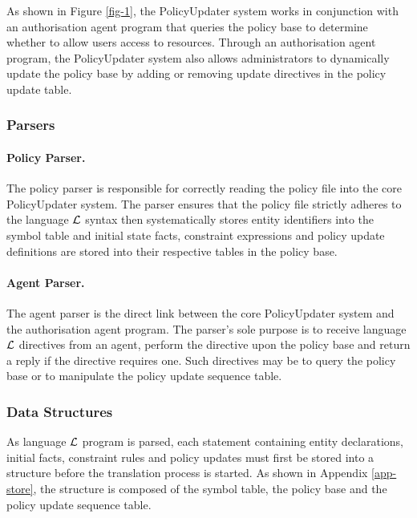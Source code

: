 \documentclass[global,twocolumn,final]{svjour}
\begin{document}
      As shown in Figure \ref{fig-1}, the PolicyUpdater system works in
      conjunction with an authorisation agent program that queries the
      policy base to determine whether to allow users access to resources.
      Through an authorisation agent program, the PolicyUpdater system also
      allows administrators to dynamically update the policy base by adding
      or removing update directives in the policy update table.

      \subsubsection{Parsers}

        \paragraph{Policy Parser.}

          The policy parser is responsible for correctly reading the policy
          file into the core PolicyUpdater system. The parser ensures that
          the policy file strictly adheres to the language $\cal{L}$ syntax
          then systematically stores entity identifiers into the symbol table
          and initial state facts, constraint expressions and policy update
          definitions are stored into their respective tables in the policy
          base.

        \paragraph{Agent Parser.}

          The agent parser is the direct link between the core PolicyUpdater
          system and the authorisation agent program. The parser's sole purpose
          is to receive language $\cal{L}$ directives from an agent, perform
          the directive upon the policy base and return a reply if the
          directive requires one. Such directives may be to query the policy
          base or to manipulate the policy update sequence table.

      \subsubsection{Data Structures}

        As language ${\cal L}$ program is parsed, each statement containing
        entity declarations, initial facts, constraint rules and policy
        updates must first be stored into a structure before the translation
        process is started. As shown in Appendix \ref{app-store}, the structure
        is composed of the symbol table, the policy base and the policy update
        sequence table.
\end{document}
